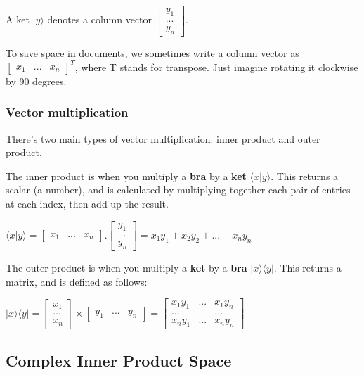\documentclass[12pt]{article}
\begin{document}
A ket $\lvert y \rangle$ denotes a column vector $\begin{bmatrix}y_1\\...\\y_n\end{bmatrix}$. 

To save space in documents, we sometimes write a column vector as $\begin{bmatrix}x_1 & ... & x_n\end{bmatrix}^T$, where T stands for transpose. Just imagine rotating it clockwise by 90 degrees.

\subsubsection{Vector multiplication}

There's two main types of vector multiplication: inner product and outer product. 

The inner product is when you multiply a \textbf{bra} by a \textbf{ket} $\langle x \lvert y \rangle$. This returns a scalar (a number), and is calculated by multiplying together each pair of entries at each index, then add up the result.

$ \langle x \lvert y \rangle = \begin{bmatrix}x_1 & ... & x_n\end{bmatrix} . \begin{bmatrix}y_1\\...\\y_n\end{bmatrix} = x_1y_1 + x_2y_2 + ... + x_ny_n$

The outer product is when you multiply a \textbf{ket} by a \textbf{bra} $\lvert x \rangle \langle y \rvert$. This returns a matrix, and is defined as follows:

$\lvert x \rangle \langle y \rvert = \begin{bmatrix}x_1\\...\\x_n\end{bmatrix} \times \begin{bmatrix}y_1 & ... & y_n\end{bmatrix} = \begin{bmatrix} x_1y_1 & ... & x_1y_n \\ ... & & ... \\ x_ny_1 & ... & x_ny_n\end{bmatrix}$

\subsection{Complex Inner Product Space}
\end{document}

